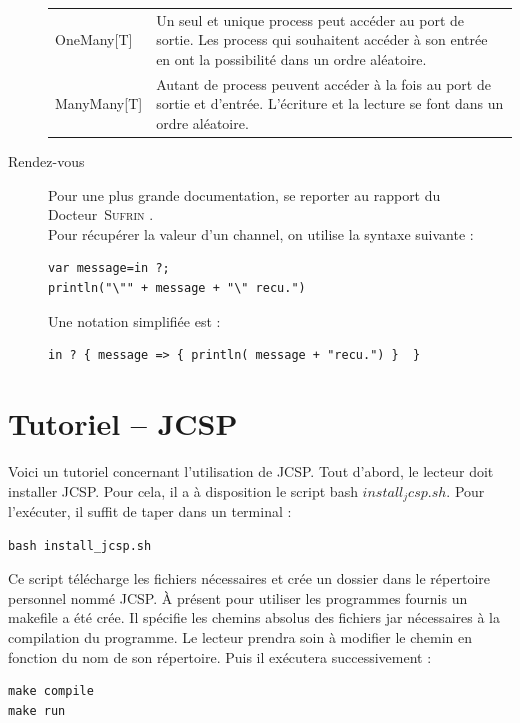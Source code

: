\documentclass[a4paper,11pt,french]{report}
\begin{document}
\begin{description}
\begin{center}
\begin{tabular}{lp{}}
\textsf{OneMany[T]} & Un seul et unique process peut accéder au port de sortie. Les process qui souhaitent accéder à son entrée en ont la possibilité dans un ordre aléatoire.\\

\textsf{ManyMany[T]} & Autant de process peuvent accéder à la fois au port de sortie et d'entrée. L'écriture et la lecture se font dans un ordre aléatoire.\\
\end{tabular}
\end{center}

\item[Rendez-vous] Pour une plus grande documentation, se reporter au rapport du Docteur~\textsc{Sufrin} \cite{cpa2008-cso}.\\ 
Pour récupérer la valeur d'un \textsf{channel}, on utilise la syntaxe suivante :
\begin{verbatim}
var message=in ?; 
println("\"" + message + "\" recu.")
\end{verbatim}

Une notation simplifiée est :
\begin{verbatim}
in ? { message => { println( message + "recu.") }  }
\end{verbatim}             

\end{description}


\chapter[Tutoriel JCSP]{Tutoriel -- JCSP}

Voici un tutoriel concernant l'utilisation de JCSP. Tout d'abord, le lecteur doit installer JCSP. Pour cela, il a à disposition le script bash $install_jcsp.sh$. Pour l'exécuter, il suffit de taper dans un terminal :

\begin{lstlisting}[frame=trBL]
bash install_jcsp.sh
\end{lstlisting}

Ce script télécharge les fichiers nécessaires et crée un dossier dans le répertoire personnel nommé JCSP. \`A présent pour utiliser les programmes  fournis un makefile a été crée. Il spécifie les chemins absolus des fichiers jar nécessaires à la compilation du programme. Le lecteur prendra soin à modifier le chemin en fonction du nom de son répertoire. Puis il exécutera successivement :

\begin{lstlisting}[frame=trBL]
make compile
make run
\end{lstlisting}
\end{document}
